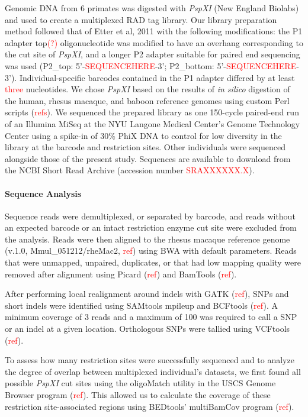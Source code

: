 \documentclass[12pt]{article}
\begin{document}
	Genomic DNA from 6 primates was digested with \emph{PspXI} (New England Biolabs) and used to create a multiplexed RAD tag library. Our library preparation method followed that of Etter et al, 2011 with the following modifications: the P1 adapter top\textcolor{red}{(?)} oligonucleotide was modified to have an overhang corresponding to the cut site of \emph{PspXI}, and a longer P2 adapter suitable for paired end sequencing was used (P2\_top: 5'-\textcolor{red}{SEQUENCEHERE}-3'; P2\_bottom: 5'-\textcolor{red}{SEQUENCEHERE}-3'). Individual-specific barcodes contained in the P1 adapter differed by at least \textcolor{red}{three} nucleotides. We chose \emph{PspXI} based on the results of \emph{in silico} digestion of the human, rhesus macaque, and baboon reference genomes using custom Perl scripts (\textcolor{red}{refs}). We sequenced the prepared library as one 150-cycle paired-end run of an Illumina MiSeq at the NYU Langone Medical Center's Genome Technology Center using a spike-in of 30\% PhiX DNA to control for low diversity in the library at the barcode and restriction sites. Other individuals were sequenced alongside those of the present study. Sequences are available to download from the NCBI Short Read Archive (accession number \textcolor{red}{SRAXXXXXX.X}).

\paragraph{Sequence Analysis}

	Sequence reads were demultiplexed, or separated by barcode, and reads without an expected barcode or an intact restriction enzyme cut site were excluded from the analysis. Reads were then aligned to the rhesus macaque reference genome (v.1.0, Mmul\_051212/rheMac2, \textcolor{red}{ref}) using BWA with default parameters. Reads that were unmapped, unpaired, duplicates, or that had low mapping quality were removed after alignment using Picard (\textcolor{red}{ref}) and BamTools (\textcolor{red}{ref}). 

	After performing local realignment around indels with GATK (\textcolor{red}{ref}), SNPs and short indels were identified using SAMtools mpileup and BCFtools (\textcolor{red}{ref}). A minimum coverage of 3 reads and a maximum of 100 was required to call a SNP or an indel at a given location. Orthologous SNPs were tallied using VCFtools (\textcolor{red}{ref}).
	
	To assess how many restriction sites were successfully sequenced and to analyze the degree of overlap between multiplexed individual's datasets, we first found all possible \emph{PspXI} cut sites using the oligoMatch utility in the USCS Genome Browser program (\textcolor{red}{ref}). This allowed us to calculate the coverage of these restriction site-associated regions using BEDtools' multiBamCov program (\textcolor{red}{ref}).
\end{document}
